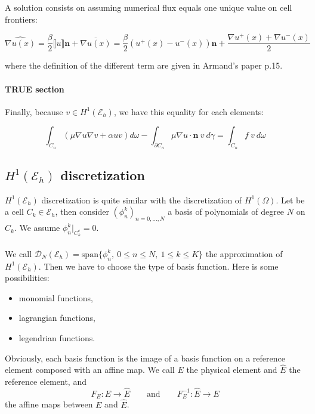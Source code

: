 \documentclass[a4paper,10pt,draft]{article}
\begin{document}
A solution consists on assuming numerical flux equals one unique value on cell frontiers:

$$
\widehat{\nabla u(x)} = \frac{\beta}{2} \llbracket u \rrbracket\mathbf{n} + \overline{\nabla u(x)} 
= \frac{\beta}{2} (u^+(x) - u^-(x)) \mathbf{n} + \frac{\nabla u^+(x) + \nabla u^-(x)}{2}
$$

where the definition of the different term are given in Armand's paper p.15.


\paragraph{TRUE section}
\begin{itshape}
 Finally, because $v \in H^1(\mathcal{E}_h)$, we have this equality for each elements:

$$
\int_{C_n} (\mu \nabla u \nabla v + \alpha uv) d\omega - \int_{\partial C_n} \mu \nabla u \cdot 
\mathbf{n}\ v\ d\gamma = \int_{C_n}  f\ v\ d\omega
$$
\end{itshape}


\subsection{$H^1(\mathcal{E}_h)$ discretization}

 $H^1(\mathcal{E}_h)$ discretization is quite similar with the discretization of $H^1(\Omega)$. Let 
be a cell $C_k \in \mathcal{E}_h$, then consider $(\phi_n^k)_{n=0,\dots,N}$ a basis of 
polynomials of degree $N$ on $C_k$. We assume $\phi_n^k|_{C_k^c}=0$.

\paragraph{}
We call $\mathcal{D}_N(\mathcal{E}_h) = \mathrm{span}\{ \phi_n^k ,\ 0\leq n \leq N,\ 1\leq k 
\leq K \}$ the approximation of $H^1(\mathcal{E}_h)$. Then we have to choose the type of basis 
function. Here is some possibilities:
\begin{itemize}
 \item monomial functions,
 \item lagrangian functions,
 \item legendrian functions.
\end{itemize}

Obviously, each basis function is the image of a basis function on a reference element composed 
with an affine map. We call $E$ the physical element and $\hat E$ the reference element, and
\begin{equation*}
 F_E : E \longrightarrow \hat E \qquad \text{and} \qquad  F_E^{-1} : \hat E \longrightarrow  E
\end{equation*}
the affine maps between $E$ and $\hat E$.
\end{document}
